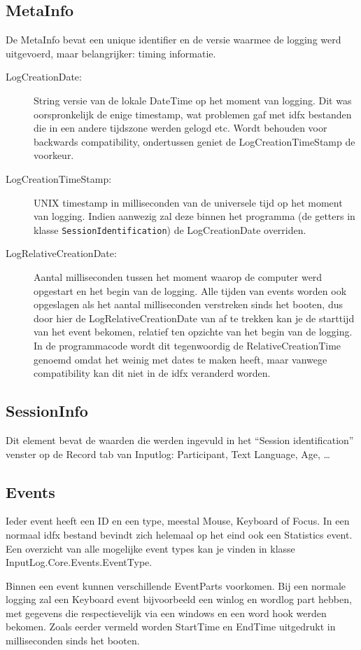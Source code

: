 \documentclass[a4paper,11pt]{report}
\begin{document}
\subsection{MetaInfo}
De MetaInfo bevat een unique identifier en de versie waarmee de logging werd uitgevoerd, maar belangrijker: timing informatie.
\begin{description}
\item[LogCreationDate:] String versie van de lokale DateTime op het moment van logging. Dit was oorspronkelijk de enige timestamp, wat problemen gaf met idfx bestanden die in een andere tijdszone werden gelogd etc. Wordt behouden voor backwards compatibility, ondertussen geniet de LogCreationTimeStamp de voorkeur.
\item[LogCreationTimeStamp:] UNIX timestamp in milliseconden van de universele tijd op het moment van logging. Indien aanwezig zal deze binnen het programma (de getters in klasse \texttt{SessionIdentification}) de LogCreationDate overriden.
\item[LogRelativeCreationDate:] Aantal milliseconden tussen het moment waarop de computer werd opgestart en het begin van de logging. Alle tijden van events worden ook opgeslagen als het aantal milliseconden verstreken sinds het booten, dus door hier de LogRelativeCreationDate van af te trekken kan je de starttijd van het event bekomen, relatief ten opzichte van het begin van de logging. In de programmacode wordt dit tegenwoordig de RelativeCreationTime genoemd omdat het weinig met dates te maken heeft, maar vanwege compatibility kan dit niet in de idfx veranderd worden.
\end{description}

\subsection{SessionInfo}
Dit element bevat de waarden die werden ingevuld in het ``Session identification'' venster op de Record tab van Inputlog: Participant, Text Language, Age, \ldots

\subsection{Events}
Ieder event heeft een ID en een type, meestal Mouse, Keyboard of Focus. In een normaal idfx bestand bevindt zich helemaal op het eind ook een Statistics event. Een overzicht van alle mogelijke event types kan je vinden in klasse  InputLog.Core.Events.EventType. 

Binnen een event kunnen verschillende EventParts voorkomen. Bij een normale logging zal een Keyboard event bijvoorbeeld een winlog en wordlog part hebben, met gegevens die respectievelijk via een windows en een word hook werden bekomen. Zoals eerder vermeld worden StartTime en EndTime uitgedrukt in milliseconden sinds het booten.
\end{document}
